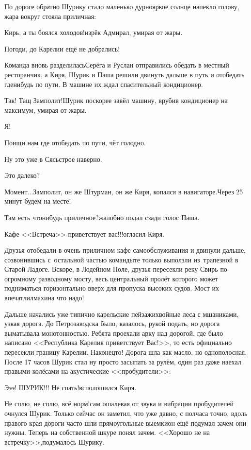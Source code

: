 По дороге обратно Шурику стало маленько дурно\mdash яркое солнце напекло голову, жара вокруг стояла приличная:

\diagdash Кирь, а ты боялся холодов!\mdash изрёк Адмирал, умирая от жары.

\diagdash Погоди, до Карелии ещё не добрались!

Команда вновь разделилась\mdash Серёга и Руслан отправились обедать в местный ресторанчик, а Киря, Шурик и Паша решили двинуть дальше в путь и отобедать где\sdash нибудь по пути. В машине их ждал спасительный кондиционер.

\diagdash Так! Тащ Замполит!\mdash Шурик поскорее завёл машину, врубив кондиционер на максимум, умирая от жары.

\diagdash Я!

\diagdash Поищи нам где отобедать по пути, чёт голодно.

\diagdash Ну это уже в Сясьстрое наверно.

\diagdash Это далеко?

\diagdash Момент$\ldots$\mdash Замполит, он же Штурман, он же Киря, копался в навигаторе.\mdash Через 25 минут будем на месте!

\diagdash Там есть что\sdash нибудь приличное?\mdash жалобно подал сзади голос Паша.

\diagdash Кафе <<Встреча>> приветствует вас!!!\mdash огласил Киря.

Друзья отобедали в очень приличном кафе самообслуживания и двинули дальше, созвонившись с~остальной частью команды\mdash те только выползли из~трапезной в Старой Ладоге. Вскоре, в Лодейном Поле, друзья пересекли реку Свирь по огромному разводному мосту, весь центральный пролёт которого может подниматься горизонтально вверх для пропуска высоких судов. Мост их впечатлил\mdash махина что надо!

Дальше начались уже типично карельские пейзажи\mdash хвойные леса с мшаниками, узкая дорога. До Петрозаводска было, казалось, рукой подать, но дорога выматывала монотонностью. Ребята проехали арку над дорогой, где было написано <<Республика Карелия приветствует Вас!>>, то есть официально пересекли границу Карелии. Наконец\sdash то! Дорога шла как масло, но однополосная. После 17 часов Шурик стал ну просто засыпать за рулём, один раз даже наехал правыми колёсами на акустические <<пробудители>>:

\diagdash Э\sdash э\sdash э! ШУРИК!!! Не спать!\mdash всполошился Киря.

\diagdash Не сплю, не сплю, всё норм!\mdash сам ошалевая от звука и вибрации пробудителей очнулся Шурик. Только сейчас он заметил, что уже давно, с полчаса точно, вдоль правого края дороги часто шли прямоугольные выемки\mdash он ещё подумал зачем они нужны. Теперь на собственной шкуре понял зачем. <<Хорошо не на встречку>>,\mdash подумалось Шурику.

